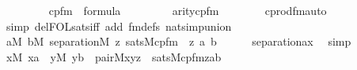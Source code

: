 \begin{isabellebody}
\ \ \ \ \isanewline
\ \ \ \ {\isachardoublequoteopen}cpfm{\isacharparenleft}{\kern0pt}{}{\isacharcomma}{\kern0pt}{}{\isacharcomma}{\kern0pt}{}{\isacharparenright}{\kern0pt}\ {\isasymin}\ formula{\isachardoublequoteclose}\isanewline
\ \ \ \ \isanewline
\ \ \ \ {\isachardoublequoteopen}arity{\isacharparenleft}{\kern0pt}cpfm{\isacharparenleft}{\kern0pt}{}{\isacharcomma}{\kern0pt}{}{\isacharcomma}{\kern0pt}{}{\isacharparenright}{\kern0pt}{\isacharparenright}{\kern0pt}\ {\isacharequal}{\kern0pt}\ {}{\isachardoublequoteclose}\isanewline
\ \ \ \ \isamarkupfalse%
\ cprod{\isacharunderscore}{\kern0pt}fm{\isacharunderscore}{\kern0pt}auto\ \isamarkupfalse%
\ {\isacharparenleft}{\kern0pt}simp\ del{\isacharcolon}{\kern0pt}FOL{\isacharunderscore}{\kern0pt}sats{\isacharunderscore}{\kern0pt}iff\ add{\isacharcolon}{\kern0pt}\ fm{\isacharunderscore}{\kern0pt}defs\ nat{\isacharunderscore}{\kern0pt}simp{\isacharunderscore}{\kern0pt}union{\isacharparenright}{\kern0pt}\isanewline
\ \ \isamarkupfalse%
\isanewline
\ \ \isamarkupfalse%
\ {\isachardoublequoteopen}{\isasymforall}a{\isasymin}M{\isachardot}{\kern0pt}\ {\isasymforall}b{\isasymin}M{\isachardot}{\kern0pt}\ separation{\isacharparenleft}{\kern0pt}{\isacharhash}{\kern0pt}{\isacharhash}{\kern0pt}M{\isacharcomma}{\kern0pt}\ {\isasymlambda}z{\isachardot}{\kern0pt}\ sats{\isacharparenleft}{\kern0pt}M{\isacharcomma}{\kern0pt}cpfm{\isacharparenleft}{\kern0pt}{}{\isacharcomma}{\kern0pt}{}{\isacharcomma}{\kern0pt}{}{\isacharparenright}{\kern0pt}\ {\isacharcomma}{\kern0pt}\ {\isacharbrackleft}{\kern0pt}z{\isacharcomma}{\kern0pt}\ a{\isacharcomma}{\kern0pt}\ b{\isacharbrackright}{\kern0pt}{\isacharparenright}{\kern0pt}{\isacharparenright}{\kern0pt}{\isachardoublequoteclose}\isanewline
\ \ \ \ \isamarkupfalse%
\ separation{\isacharunderscore}{\kern0pt}ax\ \isamarkupfalse%
\ simp\isanewline
\ \ \isamarkupfalse%
\isanewline
\ \ \isamarkupfalse%
\ {\isachardoublequoteopen}{\isacharparenleft}{\kern0pt}{\isasymexists}x{\isasymin}M{\isachardot}{\kern0pt}\ x{\isasymin}a\ {\isasymand}\ {\isacharparenleft}{\kern0pt}{\isasymexists}y{\isasymin}M{\isachardot}{\kern0pt}\ y{\isasymin}b\ {\isasymand}\ pair{\isacharparenleft}{\kern0pt}{\isacharhash}{\kern0pt}{\isacharhash}{\kern0pt}M{\isacharcomma}{\kern0pt}x{\isacharcomma}{\kern0pt}y{\isacharcomma}{\kern0pt}z{\isacharparenright}{\kern0pt}{\isacharparenright}{\kern0pt}{\isacharparenright}{\kern0pt}\ {\isasymlongleftrightarrow}\ sats{\isacharparenleft}{\kern0pt}M{\isacharcomma}{\kern0pt}cpfm{\isacharparenleft}{\kern0pt}{}{\isacharcomma}{\kern0pt}{}{\isacharcomma}{\kern0pt}{}{\isacharparenright}{\kern0pt}{\isacharcomma}{\kern0pt}{\isacharbrackleft}{\kern0pt}z{\isacharcomma}{\kern0pt}a{\isacharcomma}{\kern0pt}b{\isacharbrackright}{\kern0pt}{\isacharparenright}{\kern0pt}{\isachardoublequoteclose}\isanewline

\end{isabellebody}
